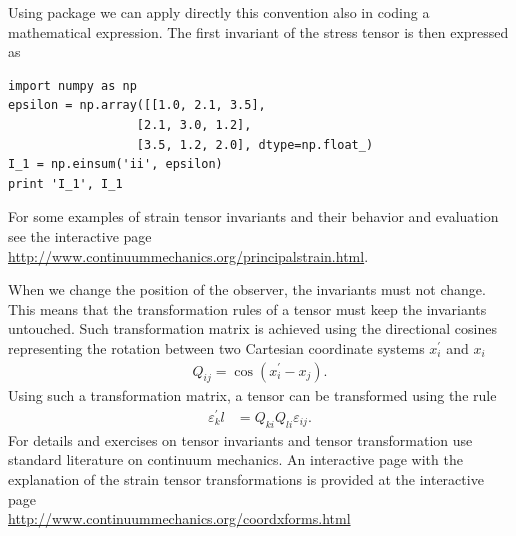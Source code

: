 \documentclass[main.tex]{subfiles}
\begin{document}
Using  package we can apply directly this convention also in coding a mathematical expression. The first invariant of the stress tensor is then expressed as
\begin{lstlisting}[name=Calsulation of the first strain tensor invariant, frame=none]
import numpy as np
epsilon = np.array([[1.0, 2.1, 3.5],
                  [2.1, 3.0, 1.2],
                  [3.5, 1.2, 2.0], dtype=np.float_)
I_1 = np.einsum('ii', epsilon)
print 'I_1', I_1
\end{lstlisting}
For some examples of strain tensor invariants and their behavior and evaluation see
the interactive page\\
\href{http://www.continuummechanics.org/principalstrain.html}{http://www.continuummechanics.org/principalstrain.html}.  

When we change the position of the observer, the invariants must not change. 
This means that the transformation rules of a tensor must keep the invariants untouched.
Such transformation matrix is achieved using the directional cosines representing the 
rotation between two Cartesian coordinate systems $x^{\prime}_i$ and $x_i$ 
\begin{align}
Q_{ij} = \cos(x_i^{\prime}-x_j).
\end{align}
Using such a transformation matrix, a tensor can be transformed using the rule
\begin{align}
\label{eq_tensor_transform}
\varepsilon^{\prime}_kl &= Q_{ki} Q_{li} \varepsilon_{ij}.
\end{align}
For details and exercises on tensor invariants and tensor transformation 
use standard literature on continuum mechanics. An interactive page 
with the explanation of the strain tensor transformations is provided at
the interactive page\\
\href{http://www.continuummechanics.org/coordxforms.html}{http://www.continuummechanics.org/coordxforms.html}
\end{document}
